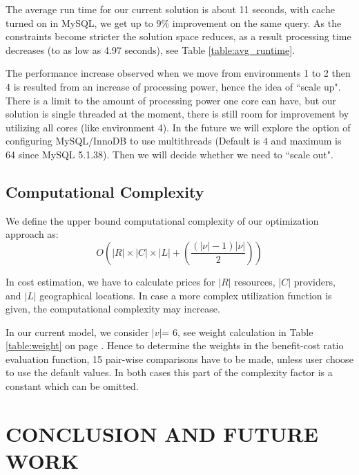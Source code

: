 \documentclass[journal]{IEEEtran}
\begin{document}
The average run time for our current solution is about 11 seconds, with cache turned on in MySQL, we get up to $9\%$ improvement on the same query. As the constraints become stricter the solution space reduces, as a result processing time decreases (to as low as 4.97 seconds), see Table \ref{table:avg_runtime}.

The performance increase observed when we move from environments 1 to 2 then 4 is resulted from an increase of processing power, hence the idea of ``scale up". There is a limit to the amount of processing power one core can have, but our solution is single threaded at the moment, there is still room for improvement by utilizing all cores (like environment 4).  In the future we will explore the option of configuring MySQL/InnoDB to use multithreads (Default is 4 and maximum is 64 since MySQL 5.1.38). Then we will decide whether we need to ``scale out". 



\subsection{Computational Complexity}

We define the upper bound computational complexity of our optimization approach as:
\begin{equation}
O\left( {\left| R \right| \times \left| C \right| \times \left| L \right| + \left( \frac{(|\nu|-1)|\nu|}{2}\right)} \right)
\end{equation}

In cost estimation, we have to calculate prices for $|R|$ resources, $|C|$ providers, and $|L|$ geographical locations. In case a more complex utilization function is given, the computational complexity may increase.

In our current model, we consider $|v|$= 6, see weight calculation in Table \ref{table:weight} on page \pageref{table:weight}. Hence to determine the weights in the benefit-cost ratio evaluation function, 15 pair-wise comparisons have to be made, unless user choose to use the default values. In both cases this part of the complexity factor is a constant which can be omitted.

 



\section{CONCLUSION AND FUTURE WORK}\label{conclusion}
\end{document}
